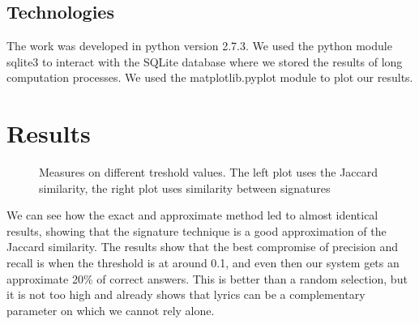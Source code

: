 \documentclass[a4paper, 11pt]{article} %
\begin{document}
\subsection*{Technologies}
The work was developed in python version 2.7.3. We used the python module sqlite3 to interact with the SQLite database where we stored the results of long computation processes. We used the matplotlib.pyplot module to plot our results.

\newpage
\section{Results}

\begin{figure}[h]
\centering
\noindent{}
\caption{Measures on different treshold values. The left plot uses the Jaccard similarity, the right plot uses similarity between signatures}
\label{fig:ad}
\end{figure}

We can see how the exact and approximate method led to almost identical results, showing that the signature technique is a good approximation of the Jaccard similarity. The results show that the best compromise of precision and recall is when the threshold is at around 0.1, and even then our system gets an approximate 20\% of correct answers.
This is better than a random selection, but it is not too high and already shows that lyrics can be a complementary parameter on which we cannot rely alone. 
\end{document}
